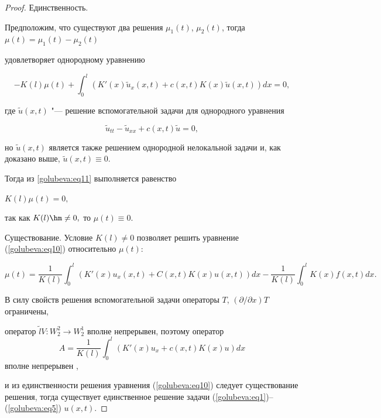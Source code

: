 \begin{proof}



{\sc\small Единственность.}

Предположим, что существуют два решения $\mu _{1}(t)$, $\mu _{2}(t)$, тогда $\mu (t)=\mu _{1}(t)-\mu _{2}(t)$

удовлетворяет однородному уравнению

\begin{equation}

\label{golubeva:eq11}

-K(l)\mu (t)+\int _{0}^{l}(K'(x)\tilde {u}_{x}(x, t)+c(x, t)K(x)\tilde {u}(x, t))dx=0,

\end{equation}

где $\tilde {u}(x, t)$ "--- решение вспомогательной задачи для однородного уравнения

 $$

 \tilde {u}_{tt}-\tilde {u}_{xx}+c(x, t)\tilde {u}=0,

 $$

но $\tilde {u}(x, t)$ является также решением однородной нелокальной задачи и, как доказано выше, $\tilde {u}(x, t)\equiv 0.$

Тогда из \eqref{golubeva:eq11} выполняется равенство

$K(l)\mu (t)=0, $

так как \mbox{$K(l)\hm\ne0,$} то $\mu (t)\equiv 0.$



{\small\sc Существование.} Условие $K(l)\ne0$ позволяет решить уравнение (\ref{golubeva:eq10}) относительно $\mu (t)$:

$$


\mu (t)=\frac{1}{K(l)}\int _{0}^{l}(K'(x)u_{x}(x, t)+C(x, t)K(x)u(x, t))dx

-\frac{1}{K(l)}\int _{0}^{l}K(x)f(x, t)dx.

$$

В силу свойств решения вспомогательной задачи операторы $T$, $({\partial }/{\partial x})T$ ограничены,

оператор $\tilde{l}V: W_{2}^{2}\to W_{2}^{1}$ вполне непрерывен, поэтому оператор $$\displaystyle A=\frac{1}{K(l)}\int _{0}^{l}(K'(x)u_{x}+c(x, t)K(x)u)dx$$ вполне непрерывен \cite{golubeva:bib6},

и из единственности решения уравнения (\ref{golubeva:eq10}) следует сущест\-вование решения, тогда существует единственное решение задачи (\ref{golubeva:eq1})--(\ref{golubeva:eq5}) $u(x, t)$.

\end{proof}



